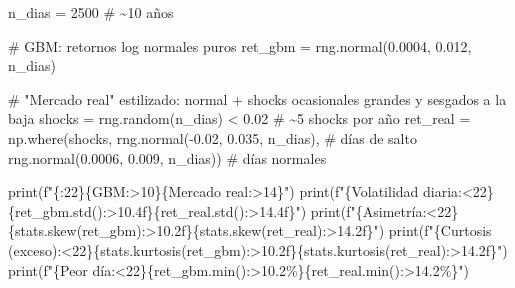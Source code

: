 \documentclass[
  spanish,
  letterpaper,
  DIV=11,
  numbers=noendperiod]{scrreprt}
\newenvironment{Shaded}{\begin{snugshade}}{\end{snugshade}}
\newcommand{\BuiltInTok}[1]{\textcolor[rgb]{0.00,0.23,0.31}{#1}}
\newcommand{\CommentTok}[1]{\textcolor[rgb]{0.37,0.37,0.37}{#1}}
\newcommand{\DecValTok}[1]{\textcolor[rgb]{0.68,0.00,0.00}{#1}}
\newcommand{\FloatTok}[1]{\textcolor[rgb]{0.68,0.00,0.00}{#1}}
\newcommand{\NormalTok}[1]{\textcolor[rgb]{0.00,0.23,0.31}{#1}}
\newcommand{\OperatorTok}[1]{\textcolor[rgb]{0.37,0.37,0.37}{#1}}
\newcommand{\SpecialCharTok}[1]{\textcolor[rgb]{0.37,0.37,0.37}{#1}}
\newcommand{\SpecialStringTok}[1]{\textcolor[rgb]{0.13,0.47,0.30}{#1}}
\newcommand{\StringTok}[1]{\textcolor[rgb]{0.13,0.47,0.30}{#1}}
\begin{document}
\label{diagnostico}
\begin{Shaded}
\begin{Highlighting}[]
\NormalTok{n\_dias }\OperatorTok{=} \DecValTok{2500}  \CommentTok{\# \textasciitilde{}10 años}

\CommentTok{\# GBM: retornos log normales puros}
\NormalTok{ret\_gbm }\OperatorTok{=}\NormalTok{ rng.normal(}\FloatTok{0.0004}\NormalTok{, }\FloatTok{0.012}\NormalTok{, n\_dias)}

\CommentTok{\# "Mercado real" estilizado: normal + shocks ocasionales grandes y sesgados a la baja}
\NormalTok{shocks }\OperatorTok{=}\NormalTok{ rng.random(n\_dias) }\OperatorTok{\textless{}} \FloatTok{0.02}                      \CommentTok{\# \textasciitilde{}5 shocks por año}
\NormalTok{ret\_real }\OperatorTok{=}\NormalTok{ np.where(shocks,}
\NormalTok{                    rng.normal(}\OperatorTok{{-}}\FloatTok{0.02}\NormalTok{, }\FloatTok{0.035}\NormalTok{, n\_dias),   }\CommentTok{\# días de salto}
\NormalTok{                    rng.normal(}\FloatTok{0.0006}\NormalTok{, }\FloatTok{0.009}\NormalTok{, n\_dias))  }\CommentTok{\# días normales}

\BuiltInTok{print}\NormalTok{(}\SpecialStringTok{f"}\SpecialCharTok{\{}\StringTok{\textquotesingle{}\textquotesingle{}}\SpecialCharTok{:22\}\{}\StringTok{\textquotesingle{}GBM\textquotesingle{}}\SpecialCharTok{:\textgreater{}10\}\{}\StringTok{\textquotesingle{}Mercado real\textquotesingle{}}\SpecialCharTok{:\textgreater{}14\}}\SpecialStringTok{"}\NormalTok{)}
\BuiltInTok{print}\NormalTok{(}\SpecialStringTok{f"}\SpecialCharTok{\{}\StringTok{\textquotesingle{}Volatilidad diaria\textquotesingle{}}\SpecialCharTok{:\textless{}22\}\{}\NormalTok{ret\_gbm}\SpecialCharTok{.}\NormalTok{std()}\SpecialCharTok{:\textgreater{}10.4f\}\{}\NormalTok{ret\_real}\SpecialCharTok{.}\NormalTok{std()}\SpecialCharTok{:\textgreater{}14.4f\}}\SpecialStringTok{"}\NormalTok{)}
\BuiltInTok{print}\NormalTok{(}\SpecialStringTok{f"}\SpecialCharTok{\{}\StringTok{\textquotesingle{}Asimetría\textquotesingle{}}\SpecialCharTok{:\textless{}22\}\{}\NormalTok{stats}\SpecialCharTok{.}\NormalTok{skew(ret\_gbm)}\SpecialCharTok{:\textgreater{}10.2f\}\{}\NormalTok{stats}\SpecialCharTok{.}\NormalTok{skew(ret\_real)}\SpecialCharTok{:\textgreater{}14.2f\}}\SpecialStringTok{"}\NormalTok{)}
\BuiltInTok{print}\NormalTok{(}\SpecialStringTok{f"}\SpecialCharTok{\{}\StringTok{\textquotesingle{}Curtosis (exceso)\textquotesingle{}}\SpecialCharTok{:\textless{}22\}\{}\NormalTok{stats}\SpecialCharTok{.}\NormalTok{kurtosis(ret\_gbm)}\SpecialCharTok{:\textgreater{}10.2f\}\{}\NormalTok{stats}\SpecialCharTok{.}\NormalTok{kurtosis(ret\_real)}\SpecialCharTok{:\textgreater{}14.2f\}}\SpecialStringTok{"}\NormalTok{)}
\BuiltInTok{print}\NormalTok{(}\SpecialStringTok{f"}\SpecialCharTok{\{}\StringTok{\textquotesingle{}Peor día\textquotesingle{}}\SpecialCharTok{:\textless{}22\}\{}\NormalTok{ret\_gbm}\SpecialCharTok{.}\BuiltInTok{min}\NormalTok{()}\SpecialCharTok{:\textgreater{}10.2\%\}\{}\NormalTok{ret\_real}\SpecialCharTok{.}\BuiltInTok{min}\NormalTok{()}\SpecialCharTok{:\textgreater{}14.2\%\}}\SpecialStringTok{"}\NormalTok{)}
\end{Highlighting}
\end{Shaded}
\end{document}
